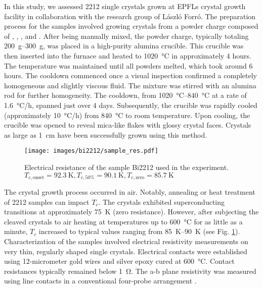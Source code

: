 In this study, we assessed 2212 single crystals grown at EPFLs crystal growth facility in collaboration with the research group of László Forró.
The preparation process for the samples involved growing crystals from a powder charge composed of , , , and .
After being manually mixed, the powder charge, typically totaling \qtyrange{200}{300}{\gram}, was placed in a high-purity alumina crucible.
This crucible was then inserted into the furnace and heated to \qty{1020}{\degreeCelsius} in approximately 4 hours.
The temperature was maintained until all powders melted, which took around 6 hours.
The cooldown commenced once a visual inspection confirmed a completely homogeneous and slightly viscous fluid.
The mixture was stirred with an alumina rod for further homogeneity.
The cooldown, from \qtyrange{1020}{840}{\degreeCelsius} at a rate of \qty{1.6}{\degreeCelsius/\hour}, spanned just over 4 days.
Subsequently, the crucible was rapidly cooled (approximately \qty{10}{\degreeCelsius/\hour}) from \qty{840}{\degreeCelsius} to room temperature.
Upon cooling, the crucible was opened to reveal mica-like flakes with glossy crystal faces. Crystals as large as \qty{1}{\centi\meter} have been successfully grown using this method.

\begin{figure}
	\centering
	\texttt{[image: images/bi2212/sample\_res.pdf]}
	\caption{Electrical resistance of the sample Bi2212 used in the experiment. $T_{c,\text{onset}}=\qty{92.3}{\kelvin}, T_{c,\text{50\%}}=\qty{90.1}{\kelvin}, T_{c,\text{zero}}=\qty{85.7}{\kelvin}$}
	\label{fig:sample_res}
\end{figure}


The crystal growth process occurred in air.
Notably, annealing or heat treatment of 2212 samples can impact $T_c$.
The crystals exhibited superconducting transitions at approximately \qty{75}{\kelvin} (zero resistance).
However, after subjecting the cleaved crystals to air heating at temperatures up to \qty{600}{\degreeCelsius} for as little as a minute, $T_c$ increased to typical values ranging from \qtyrange{85}{90}{\kelvin} (see Fig. \ref{fig:sample_res}).
Characterization of the samples involved electrical resistivity measurements on very thin, regularly shaped single crystals. Electrical contacts were established using 12-micrometer gold wires and silver epoxy cured at \qty{600}{\degreeCelsius}.
Contact resistances typically remained below \qty{1}{\ohm}.
The a-b plane resistivity was measured using line contacts in a conventional four-probe arrangement \cite{kendziora_composition_1992}.


